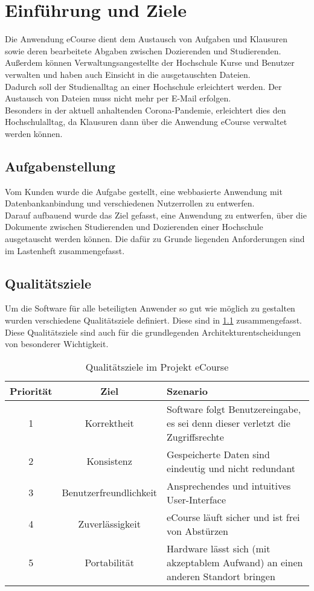 
\chapter{Einführung und Ziele}
Die Anwendung eCourse dient dem Austausch von \gls{Aufgabe}n und \gls{Klausur}en sowie deren \gls{bearbeitete Abgabe}n zwischen \gls{Dozierende}n und \gls{Studierende}n. Außerdem können \gls{Verwaltungsangestellte der Hochschule} \gls{Kurs}e und Benutzer verwalten und haben auch Einsicht in die ausgetauschten Dateien. \\
Dadurch soll der Studienalltag an einer Hochschule erleichtert werden. Der Austausch von Dateien muss nicht mehr per E-Mail erfolgen. \\
Besonders in der aktuell anhaltenden Corona-Pandemie, erleichtert dies den Hochschulalltag, da \gls{Klausur}en dann über die Anwendung eCourse verwaltet werden können.  

\section{Aufgabenstellung}
\label{sec:Aufgabe}
Vom Kunden wurde die Aufgabe gestellt, eine webbasierte Anwendung mit Datenbankanbindung und verschiedenen Nutzerrollen zu entwerfen. \\
Darauf aufbauend wurde das Ziel gefasst, eine Anwendung zu entwerfen, über die Dokumente zwischen \gls{Studierende}n und \gls{Dozierende}n einer Hochschule ausgetauscht werden können. Die dafür zu Grunde liegenden Anforderungen sind im Lastenheft zusammengefasst.

\section{Qualitätsziele}
\label{sec:Quali}
Um die Software für alle beteiligten Anwender so gut wie möglich zu gestalten wurden verschiedene Qualitätsziele definiert. Diese sind in \ref{tab:Qualitätsziele} zusammengefasst. Diese Qualitätsziele sind auch für die grundlegenden Architekturentscheidungen von besonderer Wichtigkeit.

\begin{table}
\centering
\begin{tabularx}{\textwidth}[H]{|c|c|X|}
\hline
Priorität &	Ziel & Szenario\\
\hline
1 & Korrektheit & Software folgt Benutzereingabe, es sei denn dieser verletzt die Zugriffsrechte \\
\hline
2 & Konsistenz & Gespeicherte Daten sind eindeutig und nicht redundant \\
\hline
3 & Benutzerfreundlichkeit & Ansprechendes und intuitives User-Interface \\
\hline
4 & Zuverlässigkeit & eCourse läuft sicher und ist frei von Abstürzen \\
\hline
5 & Portabilität & Hardware lässt sich (mit akzeptablem Aufwand) an einen anderen Standort bringen\\
\hline
\end{tabularx}
\caption{Qualitätsziele im Projekt eCourse}
\label{tab:Qualitätsziele}
\end{table}

